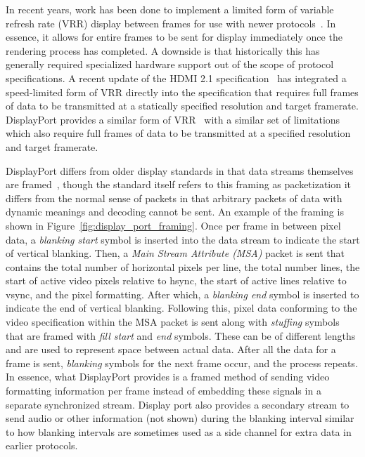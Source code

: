     In recent years, work has been done to implement a limited form of variable refresh rate (VRR) display between frames for use with newer protocols~\cite{AMD2019,NVIDIA2020_1}. In essence, it allows for entire frames to be sent for display immediately once the rendering process has completed. A downside is that historically this has generally required specialized hardware support out of the scope of protocol specifications. A recent update of the HDMI 2.1 specification~\cite{HDMIForum2018} has integrated a speed-limited form of VRR directly into the specification that requires full frames of data to be transmitted at a statically specified resolution and target framerate. DisplayPort provides a similar form of VRR~\cite{VESA2014} with a similar set of limitations which also require full frames of data to be transmitted at a specified resolution and target framerate.

    DisplayPort differs from older display standards in that data streams themselves are framed~\cite{VESA2011,Wiley2011}, though the standard itself refers to this framing as packetization it differs from the normal sense of packets in that arbitrary packets of data with dynamic meanings and decoding cannot be sent. An example of the framing is shown in Figure~\ref{fig:display_port_framing}. Once per frame in between pixel data, a {\it blanking start} symbol is inserted into the data stream to indicate the start of vertical blanking. Then, a {\it Main Stream Attribute (MSA)} packet is sent that contains the total number of horizontal pixels per line, the total number lines, the start of active video pixels relative to hsync, the start of active lines relative to vsync, and the pixel formatting. After which, a {\it blanking end} symbol is inserted to indicate the end of vertical blanking. Following this, pixel data conforming to the video specification within the MSA packet is sent along with {\it stuffing} symbols that are framed with {\it fill start} and {\it end} symbols. These can be of different lengths and are used to represent space between actual data. After all the data for a frame is sent, {\it blanking} symbols for the next frame occur, and the process repeats. In essence, what DisplayPort provides is a framed method of sending video formatting information per frame instead of embedding these signals in a separate synchronized stream. Display port also provides a secondary stream to send audio or other information (not shown) during the blanking interval similar to how blanking intervals are sometimes used as a side channel for extra data in earlier protocols.


